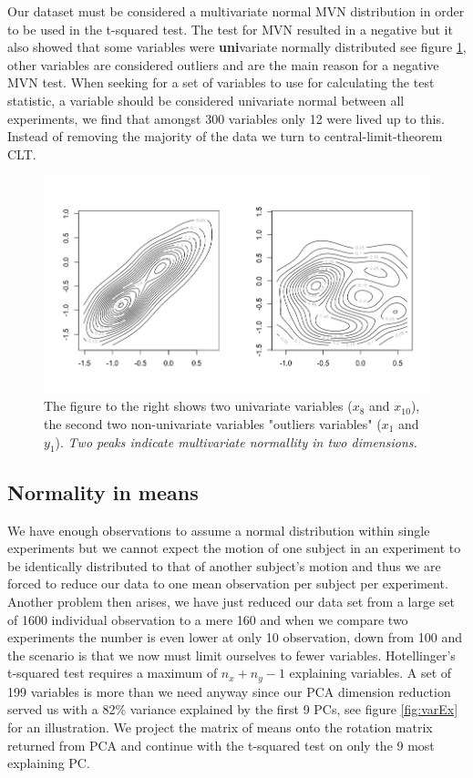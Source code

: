 \documentclass{article}
\begin{document}
\newpage
Our dataset must be considered a multivariate normal MVN distribution in order to be used in the t-squared test. The test for MVN resulted in a negative but it also showed that some variables were \textbf{uni}variate normally distributed see figure \ref{fig:multiVar}, other variables are considered outliers and are the main reason for a negative MVN test. When seeking for a set of variables to use for calculating the test statistic, a variable should be considered univariate normal between all experiments, we find that amongst 300 variables only 12 were lived up to this. Instead of removing the majority of the data we turn to central-limit-theorem CLT.\\

\begin{figure}[H]
	\includegraphics[width=\linewidth]{multiVar.png}
	\caption{The figure to the right shows two univariate variables ($x_8$ and $x_10$), the second two non-univariate variables "outliers variables" ($x_1$ and $y_1$). \textit{Two peaks indicate multivariate normallity in two dimensions.}}
	\label{fig:multiVar}
\end{figure}

\subsection{Normality in means}
We have enough observations to assume a normal distribution within single experiments but we cannot expect the motion of one subject in an experiment to be identically distributed to that of another subject's motion and thus we are forced to reduce our data to one mean observation per subject per experiment. Another problem then arises, we have just reduced our data set from a large set of 1600 individual observation to a mere 160 and when we compare two experiments the number is even lower at only 10 observation, down from 100 and the scenario is that we now must limit ourselves to fewer variables. Hotellinger's t-squared test requires a maximum of $n_x+n_y-1$ explaining variables. A set of 199 variables is more than we need anyway since our PCA dimension reduction served us with a 82\% variance explained by the first 9 PCs, see figure \ref{fig:varEx} for an illustration. We project the matrix of means onto the rotation matrix returned from PCA and continue with the t-squared test on only the 9 most explaining PC. 
\end{document}
